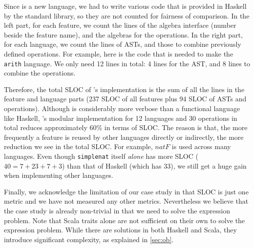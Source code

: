 Since \sedel is a new language, we
had to write various code that is provided in Haskell by the standard library,
so they are not counted for fairness of comparison. In the left part, for each
feature, we count the lines of the algebra interface (number beside the feature
name), and the algebras for the operations. In the right part, for each
language, we count the lines of ASTs, and those to combine previously
defined operations. For example, here is the code that is needed to make the
\lstinline{arith} language.
We only need 12 lines in total: 4 lines for the AST, and 8 lines to combine the operations.

Therefore, the total SLOC of \sedel's implementation is the sum of all the
lines in the feature and language parts (237 SLOC of all features plus 94 SLOC
of ASTs and operations). Although \sedel is considerably more verbose than a
functional language like Haskell, \sedel's modular implementation for 12 languages and 30
operations in total reduces approximately 60\% in terms of SLOC. The reason is
that, the more frequently a feature is reused by other languages directly or
indirectly, the more reduction we see in the total SLOC. For example,
$\mathit{natF}$ is used across many languages. Even though \lstinline{simplenat}
itself \emph{alone} has more SLOC ($40 = 7+23+7+3$) than that of Haskell (which
has 33), we still get a huge gain when implementing other languages.

Finally, we acknowledge the limitation of our case study in that SLOC is just
one metric and we have not measured any other metrics. Nevertheless we believe
that the case study is already non-trivial in that we need to solve the
expression problem. Note that Scala traits alone are not sufficient on their own
to solve the expression problem. While there are solutions in both Haskell and Scala, they
introduce significant complexity, as explained in \cref{sec:ob}.
